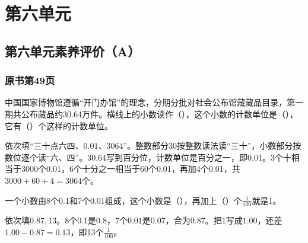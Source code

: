 \chapter{第六单元}


\section{第六单元素养评价（A）}



\subsection*{原书第49页}

中国国家博物馆遵循“开门办馆”的理念，分期分批对社会公布馆藏藏品目录，第一期共公布藏品约30.64万件。横线上的小数读作（\hspace{1.8em}），这个小数的计数单位是（\hspace{1.8em}），它有（\hspace{1.8em}）个这样的计数单位。\par
\begin{BookAnswer}
依次填“三十点六四、\(0.01\)、\(3064\)”。整数部分30按整数读法读“三十”，小数部分按数位逐个读“六、四”。30.64写到百分位，计数单位是百分之一，即0.01。3个十相当于3000个0.01，6个十分之一相当于60个0.01，再加4个0.01，共\(3000+60+4=3064\)个。
\end{BookAnswer}

一个小数由8个0.1和7个0.01组成，这个小数是（\hspace{1.8em}），再加上（\hspace{1.8em}）个\(\frac1{100}\)就是1。\par
\begin{BookAnswer}
依次填\(0.87,13\)。\(8\)个\(0.1\)是\(0.8\)，\allowbreak{}\(7\)个\(0.01\)是\(0.07\)，合为\(0.87\)。把1写成\(1.00\)，还差\(1.00-0.87=0.13\)，即13个\(\frac1{100}\)。
\end{BookAnswer}

